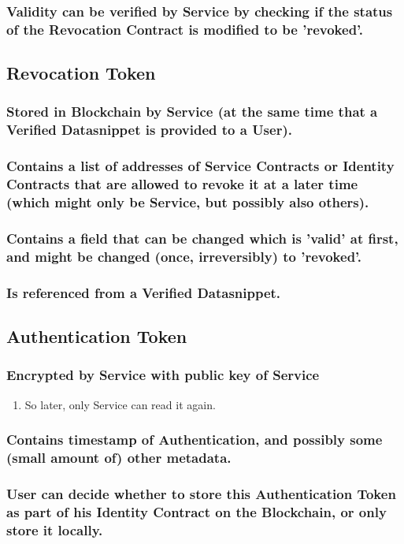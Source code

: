\documentclass[11pt]{article}
\begin{document}
\subsubsection{Validity can be verified by Service by checking if the status of the Revocation Contract is modified to be 'revoked'.}
\label{sec:orge3b38b2}
\subsection{Revocation Token}
\label{sec:org1dba46d}
\subsubsection{Stored in Blockchain by Service (at the same time that a Verified Datasnippet is provided to a User).}
\label{sec:org59a3fc7}
\subsubsection{Contains a list of addresses of Service Contracts or Identity Contracts that are allowed to revoke it at a later time (which might only be Service, but possibly also others).}
\label{sec:org0f4bb46}
\subsubsection{Contains a field that can be changed which is 'valid' at first, and might be changed (once, irreversibly) to 'revoked'.}
\label{sec:orgcedaed7}
\subsubsection{Is referenced from a Verified Datasnippet.}
\label{sec:orgfcecc51}
\subsection{Authentication Token}
\label{sec:org6a14791}
\subsubsection{Encrypted by Service with public key of Service}
\label{sec:orgec52b10}
\begin{enumerate}
\item So later, only Service can read it again.
\label{sec:org3e83b59}
\end{enumerate}
\subsubsection{Contains timestamp of Authentication, and possibly some (small amount of) other metadata.}
\label{sec:orgbc8aa68}
\subsubsection{User can decide whether to store this Authentication Token as part of his Identity Contract on the Blockchain, or only store it locally.}
\label{sec:org3450c7f}
\end{document}
